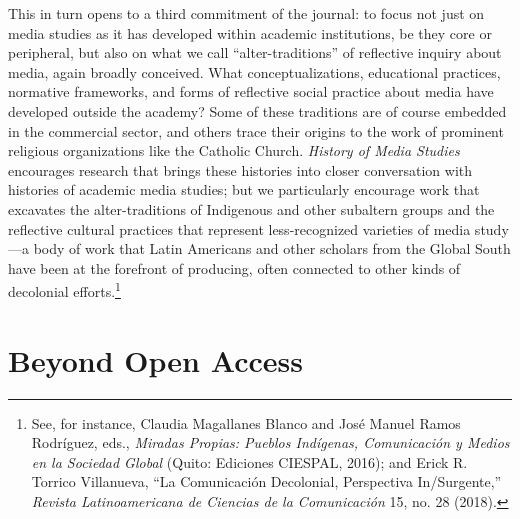 \documentclass{tufte-handout}
\begin{document}
This in turn opens to a third commitment of the journal: to focus not
just on media studies as it has developed within academic institutions,
be they core or peripheral, but also on what we call
``alter-traditions'' of reflective inquiry about media, again broadly
conceived. What conceptualizations, educational practices, normative
frameworks, and forms of reflective social practice about media have
developed outside the academy? Some of these traditions are of course
embedded in the commercial sector, and others trace their origins to the
work of prominent religious organizations like the Catholic Church.
\emph{History of Media Studies} encourages research that brings these
histories into closer conversation with histories of academic media
studies; but we particularly encourage work that excavates the
alter-traditions of Indigenous and other subaltern groups and the
reflective cultural practices that represent less-recognized varieties
of media study---a body of work that Latin Americans and other scholars
from the Global South have been at the forefront of producing, often
connected to other kinds of decolonial
efforts.\footnote{See, for instance, Claudia Magallanes Blanco and José Manuel Ramos
  Rodríguez, eds., \emph{Miradas Propias: Pueblos Indígenas,
  Comunicación y Medios en la Sociedad Global} (Quito: Ediciones
  CIESPAL, 2016); and Erick R. Torrico Villanueva, ``La Comunicación
  Decolonial, Perspectiva In/Surgente,'' \emph{Revista Latinoamericana
  de Ciencias de la Comunicación} 15, no. 28 (2018).
}

\hypertarget{beyond-open-access}{%
\section{Beyond Open Access}\label{beyond-open-access}}
\end{document}
